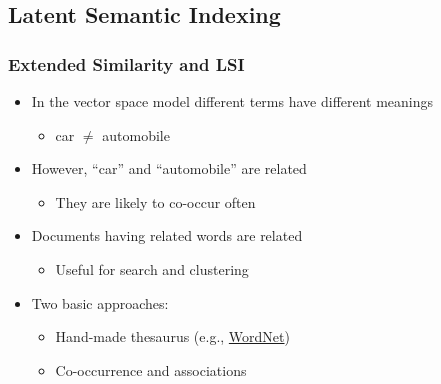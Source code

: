 \documentclass{beamer}
\begin{document}


\subsection{Latent Semantic Indexing}

\begin{frame}
  \frametitle{Extended Similarity and LSI}

  \begin{itemize}
  \item In the vector space model different terms have different meanings
    \begin{itemize}
    \item car $\neq$ automobile
    \end{itemize}
  \item However, ``car'' and ``automobile'' are related
    \begin{itemize}
    \item They are likely to co-occur often
    \end{itemize}
  \item Documents having related words are related
    \begin{itemize}
    \item Useful for search and clustering
    \end{itemize}
  \item Two basic approaches:
    \begin{itemize}
    \item Hand-made thesaurus (e.g., \href{http://wordnetweb.princeton.edu/perl/webwn}{WordNet})
    \item Co-occurrence and associations
    \end{itemize}
  \end{itemize}

\end{frame}

\end{document}

